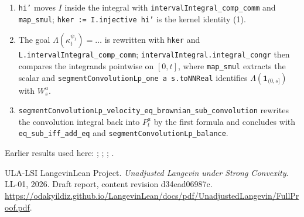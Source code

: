 \documentclass[11pt,a4paper]{article}
\begin{document}
\begin{leanbox}
\begin{enumerate}
\item \texttt{hi'} moves \(I\) inside the integral with \texttt{interval\allowbreak{}Integral\_\allowbreak{}comp\_\allowbreak{}comm} and \texttt{map\_\allowbreak{}smul}; \texttt{hker := I.\allowbreak{}injective hi'} is the kernel identity (1).

\item The goal \(\Lambda(\kappa^{\psi_1}_t)=\dots\) is rewritten with \texttt{hker} and \texttt{L.\allowbreak{}interval\allowbreak{}Integral\_\allowbreak{}comp\_\allowbreak{}comm}; \texttt{interval\allowbreak{}Integral.\allowbreak{}integral\_\allowbreak{}congr} then compares the integrands pointwise on \([0,t]\), where \texttt{map\_\allowbreak{}smul} extracts the scalar and \texttt{segment\allowbreak{}Convolution\allowbreak{}Lp\_\allowbreak{}one a s.\allowbreak{}to\allowbreak{}NNReal} identifies \(\Lambda(\mathbf 1_{(0,s]})\) with \(W^a_s\).

\item \texttt{segment\allowbreak{}Convolution\allowbreak{}Lp\_\allowbreak{}velocity\_\allowbreak{}eq\_\allowbreak{}brownian\_\allowbreak{}sub\_\allowbreak{}convolution} rewrites the convolution integral back into \(P^a_t\) by the first formula and concludes with \texttt{eq\_\allowbreak{}sub\_\allowbreak{}iff\_\allowbreak{}add\_\allowbreak{}eq} and \texttt{segment\allowbreak{}Convolution\allowbreak{}Lp\_\allowbreak{}balance}.

\end{enumerate}
\end{leanbox}


Earlier results used here: \cite[Section~3.6.12]{LangevinLean2026ULASC}; \cite[Section~3.8.2]{LangevinLean2026ULASC}; \cite[Section~3.8.5]{LangevinLean2026ULASC}; \cite[Section~3.8.9]{LangevinLean2026ULASC}.

\begin{thebibliography}{ULA-LSI}
LangevinLean Project. \emph{Unadjusted Langevin under Strong Convexity}. LL-01, 2026. Draft report, content revision d34ead06987c. \url{https://odakyildiz.github.io/LangevinLean/docs/pdf/UnadjustedLangevin/FullProof.pdf}.
\end{thebibliography}
\end{document}
